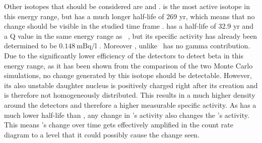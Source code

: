 \documentclass[encoding=utf8,british]{tumphthesis}
\begin{document}
Other isotopes that should be considered are  and .
 is the most active isotope in this energy range, but has a much longer half-life of 269 yr, which means that no change should be visible in the studied time frame \cite{singh_nuclear_2014}.
 has a half-life of 32.9 yr and a Q value in the same energy range as \Kr\  \cite{chen_nuclear_2016}, but its specific activity has already been determined to be $0.148 \ \mathrm{mBq/l}$ \cite{schmidt_results_2014}.
Moreover , unlike \Kr\, has no gamma contribution.
Due to the significantly lower efficiency of the detectors to detect beta in this energy range, as it has been shown from the comparison of the two Monte Carlo simulations, no change generated by this isotope should be detectable.
However, its also unstable daughter nucleus  is positively charged right after its creation and is therefore not homogeneously distributed.
This results in a much higher  density around the detectors and therefore a higher measurable specific activity.
As  has a much lower half-life than , any change in 's activity also changes the 's activity.
This means 's change over time gets effectively amplified in the count rate diagram to a level that it could possibly cause the change seen.
\\
\end{document}
